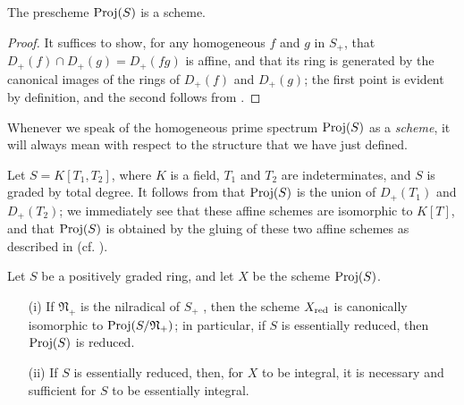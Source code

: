 \begin{proposition}[2.4.2]
\label{II.2.4.2}
The prescheme $\operatorname{Proj}(S)$ is a scheme.
\end{proposition}

\begin{proof}
It suffices  to show, for any homogeneous $f$ and $g$ in $S_+$, that $D_+(f)\cap D_+(g)=D_+(fg)$ is affine, and that its ring is generated by the canonical images of the rings of $D_+(f)$ and $D_+(g)$;
the first point is evident by definition, and the second follows from .
\end{proof}

Whenever we speak of the homogeneous prime spectrum $\operatorname{Proj}(S)$ as a \emph{scheme}, it will always mean with respect to the structure that we have just defined.

\begin{example}[2.4.3]
\label{II.2.4.3}
Let $S=K[T_1,T_2]$, where $K$ is a field, $T_1$ and $T_2$ are indeterminates, and $S$ is graded by total degree.
It follows from  that $\operatorname{Proj}(S)$ is the union of $D_+(T_1)$ and $D_+(T_2)$;
we immediately see that these affine schemes are isomorphic to $K[T]$, and that $\operatorname{Proj}(S)$ is obtained by the gluing of these two affine schemes as described in  (cf. ).
\end{example}

\begin{proposition}[2.4.4]
\label{II.2.4.4}
Let $S$ be a positively graded ring, and let $X$ be the scheme $\operatorname{Proj}(S)$.
\begin{enumerate}
  \item[{\rm(i)}] If $\mathfrak{N}_+$ is the nilradical of $S_+$ , then the scheme $X_{\mathrm{red}}$ is canonically isomorphic to $\operatorname{Proj}(S/\mathfrak{N}_+)$;
    in particular, if $S$ is essentially reduced, then $\operatorname{Proj}(S)$ is reduced.
  \item[{\rm(ii)}] If $S$ is essentially reduced, then, for $X$ to be integral, it is necessary and sufficient for $S$ to be essentially integral.
\end{enumerate}
\end{proposition}

